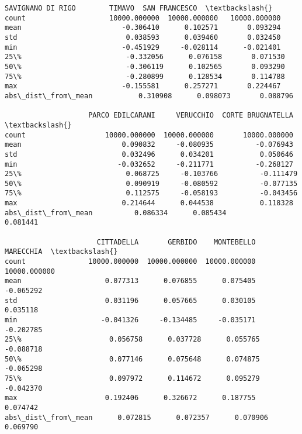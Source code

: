 \documentclass[11pt]{article}
\makeatletter
\newcommand{\boxspacing}{\kern\kvtcb@left@rule\kern\kvtcb@boxsep}
\newcommand{\prompt}[4]{
        {\ttfamily\llap{{\color{#2}[#3]:\hspace{3pt}#4}}\vspace{-\baselineskip}}
    }
\makeatother
\begin{document}
            \begin{tcolorbox}[breakable, size=fbox, boxrule=.5pt, pad at break*=1mm, opacityfill=0]
\prompt{Out}{outcolor}{18}{\boxspacing}
\begin{Verbatim}[commandchars=\\\{\}]
                    SAVIGNANO DI RIGO        TIMAVO  SAN FRANCESCO  \textbackslash{}
count                    10000.000000  10000.000000   10000.000000
mean                        -0.306410      0.102571       0.093294
std                          0.038593      0.039460       0.032450
min                         -0.451929     -0.028114      -0.021401
25\%                         -0.332056      0.076158       0.071530
50\%                         -0.306119      0.102565       0.093290
75\%                         -0.280899      0.128534       0.114788
max                         -0.155581      0.257271       0.224467
abs\_dist\_from\_mean           0.310908      0.098073       0.088796

                    PARCO EDILCARANI     VERUCCHIO  CORTE BRUGNATELLA  \textbackslash{}
count                   10000.000000  10000.000000       10000.000000
mean                        0.090832     -0.080935          -0.076943
std                         0.032496      0.034201           0.050646
min                        -0.032652     -0.211771          -0.268127
25\%                         0.068725     -0.103766          -0.111479
50\%                         0.090919     -0.080592          -0.077135
75\%                         0.112575     -0.058193          -0.043456
max                         0.214644      0.044538           0.118328
abs\_dist\_from\_mean          0.086334      0.085434           0.081441

                      CITTADELLA       GERBIDO    MONTEBELLO     MARECCHIA  \textbackslash{}
count               10000.000000  10000.000000  10000.000000  10000.000000
mean                    0.077313      0.076855      0.075405     -0.065292
std                     0.031196      0.057665      0.030105      0.035118
min                    -0.041326     -0.134485     -0.035171     -0.202785
25\%                     0.056758      0.037728      0.055765     -0.088718
50\%                     0.077146      0.075648      0.074875     -0.065298
75\%                     0.097972      0.114672      0.095279     -0.042370
max                     0.192406      0.326672      0.187755      0.074742
abs\_dist\_from\_mean      0.072815      0.072357      0.070906      0.069790


\end{Verbatim}
\end{tcolorbox}
\end{document}
